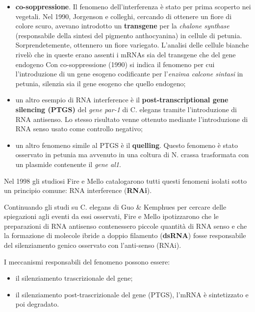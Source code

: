 \documentclass[]{article}
\begin{document}
\begin{itemize}
\itemsep1pt\parskip0pt
\item
  \textbf{co-soppressione}. Il fenomeno dell'interferenza è stato per
  prima scoperto nei vegetali. Nel 1990, Jorgenson e colleghi, cercando
  di ottenere un fiore di colore scuro, avevano introdotto un
  \textbf{transgene} per la \emph{chalone synthase} (responsabile della
  sintesi del pigmento anthocyanina) in cellule di petunia.
  Sorprendetemente, ottennero un fiore variegato. L'analisi delle
  cellule bianche rivelò che in queste erano assenti i mRNAs sia del
  transgene che del gene endogeno Con co-soppressione (1990) si indica
  il fenomeno per cui l'introduzione di un gene esogeno codificante per
  l'\emph{enzima calcone sintasi} in petunia, silenzia sia il gene
  esogeno che quello endogeno;
\item
  un altro esempio di RNA interference è il \textbf{post-transcriptional
  gene silencing (PTGS)} del \emph{gene par-1} di C. elegans tramite
  l'introduzione di RNA antisenso. Lo stesso risultato venne ottenuto
  mediante l'introduzione di RNA senso usato come controllo negativo;
\item
  un altro fenomeno simile al PTGS è il \textbf{quelling}. Questo
  fenomeno è stato osservato in petunia ma avvenuto in una coltura di N.
  crassa trasformata con un plasmide contenente il \emph{gene al1}.
\end{itemize}

Nel 1998 gli studiosi Fire e Mello catalogarono tutti questi fenomeni
isolati sotto un principio comune: RNA interference (\textbf{RNAi}).

Continuando gli studi su C. elegans di Guo \& Kemphues per cercare delle
spiegazioni agli eventi da essi osservati, Fire e Mello ipotizzarono che
le preparazioni di RNA antisenso contenessero piccole quantità di RNA
senso e che la formazione di molecole ibride a doppio filamento
(\textbf{dsRNA}) fosse responsabile del silenziamento genico osservato
con l'anti-senso (RNAi).

I meccanismi responsabili del fenomeno possono essere:

\begin{itemize}
\itemsep1pt\parskip0pt
\item
  il silenziamento trascrizionale del gene;
\item
  il silenziamento post-trascrizionale del gene (PTGS), l'mRNA è
  sintetizzato e poi degradato.
\end{itemize}
\end{document}
